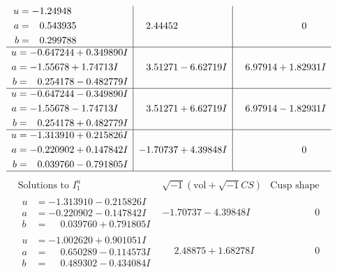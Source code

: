 \documentclass[1p]{elsarticle_modified}
\theoremstyle{definition}
\newcommand{\I}{\sqrt{-1}}
\begin{document}
$$\begin{array}{c|c|c}
\begin{aligned}
u &= -1.24948\phantom{ +0.000000I} \\
a &= \phantom{-}0.543935\phantom{ +0.000000I} \\
b &= \phantom{-}0.299788\phantom{ +0.000000I}\end{aligned}
 & \phantom{-}2.44452\phantom{ +0.000000I} & \phantom{-0.000000 } 0 \\ \hline\begin{aligned}
u &= -0.647244 + 0.349890 I \\
a &= -1.55678 + 1.74713 I \\
b &= \phantom{-}0.254178 - 0.482779 I\end{aligned}
 & \phantom{-}3.51271 - 6.62719 I & \phantom{-}6.97914 + 1.82931 I \\ \hline\begin{aligned}
u &= -0.647244 - 0.349890 I \\
a &= -1.55678 - 1.74713 I \\
b &= \phantom{-}0.254178 + 0.482779 I\end{aligned}
 & \phantom{-}3.51271 + 6.62719 I & \phantom{-}6.97914 - 1.82931 I \\ \hline\begin{aligned}
u &= -1.313910 + 0.215826 I \\
a &= -0.220902 + 0.147842 I \\
b &= \phantom{-}0.039760 - 0.791805 I\end{aligned}
 & -1.70737 + 4.39848 I & \phantom{-0.000000 } 0\\
 \hline 
 \end{array}$$\newpage$$\begin{array}{c|c|c}  
\text{Solutions to }I^u_{1}& \I (\text{vol} + \sqrt{-1}CS) & \text{Cusp shape}\\
 \hline 
\begin{aligned}
u &= -1.313910 - 0.215826 I \\
a &= -0.220902 - 0.147842 I \\
b &= \phantom{-}0.039760 + 0.791805 I\end{aligned}
 & -1.70737 - 4.39848 I & \phantom{-0.000000 } 0 \\ \hline\begin{aligned}
u &= -1.002620 + 0.901051 I \\
a &= \phantom{-}0.650289 - 0.114573 I \\
b &= \phantom{-}0.489302 - 0.434084 I\end{aligned}
 & \phantom{-}2.48875 + 1.68278 I & \phantom{-0.000000 } 0 \\ \hline\begin{aligned}

\end{aligned}
\end{array}$$
\end{document}

